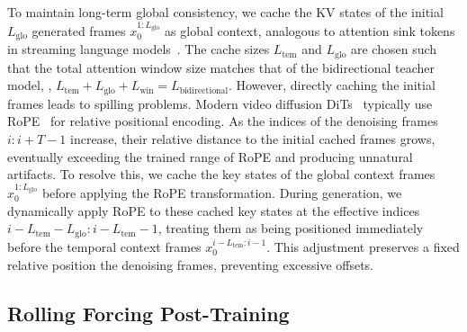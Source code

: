 To maintain long-term global consistency, we cache the KV states of the initial $L_{\mathrm{glo}}$ generated frames $x_0^{1:L_{\mathrm{glo}}}$ as global context, analogous to attention sink tokens in streaming language models~\citep{xiao2023efficient}. The cache sizes $L_{\mathrm{tem}}$ and $L_{\mathrm{glo}}$ are chosen such that the total attention window size matches that of the bidirectional teacher model, \ie, $L_{\mathrm{tem}} + L_{\mathrm{glo}} + L_{\mathrm{win}} = L_{\mathrm{bidirectional}}$.
However, directly caching the initial frames leads to spilling problems. Modern video diffusion DiTs~\citep{peebles2023scalable} typically use RoPE~\citep{su2024roformer} for relative positional encoding. As the indices of the denoising frames $i:i+T-1$ increase, their relative distance to the initial cached frames grows, eventually exceeding the trained range of RoPE and producing unnatural artifacts.
To resolve this, we cache the key states of the global context frames $x_0^{1:L_{\mathrm{glo}}}$ before applying the RoPE transformation. During generation, we dynamically apply RoPE to these cached key states at the effective indices $  i - L_{\mathrm{tem}} - L_{\mathrm{glo}} :i - L_{\mathrm{tem}}-1$, treating them as being positioned immediately before the temporal context frames $x^{i-L_{\mathrm{tem}}:i-1}_0$. This adjustment preserves a fixed relative position \wrt the denoising frames, preventing excessive offsets.


\subsection{Rolling Forcing Post-Training}
\label{sec:training}




